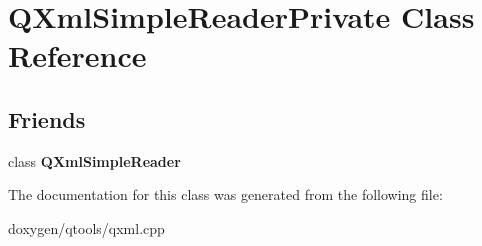 \hypertarget{class_q_xml_simple_reader_private}{}\section{Q\+Xml\+Simple\+Reader\+Private Class Reference}
\label{class_q_xml_simple_reader_private}
\subsection*{Friends}
\begin{DoxyCompactItemize}
\item 
\mbox{\label{class_q_xml_simple_reader_private_aba6d8e1fe7917a5056b07bf8d4b4e53c}} 
class {\bfseries Q\+Xml\+Simple\+Reader}
\end{DoxyCompactItemize}


The documentation for this class was generated from the following file\+:\begin{DoxyCompactItemize}
\item 
doxygen/qtools/qxml.\+cpp\end{DoxyCompactItemize}

